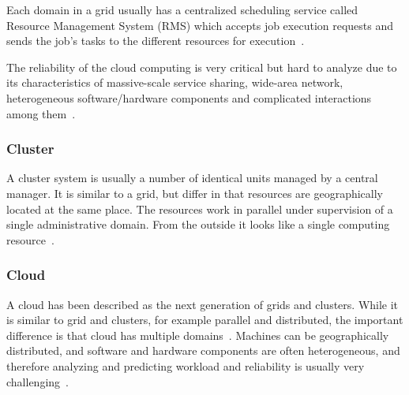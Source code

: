 \documentclass{cslthse-msc}
\begin{document}
Each domain in a grid usually has a centralized scheduling service called Resource Management System (RMS) which accepts job execution requests and sends the job's tasks to the different resources for execution~\cite{evalOfGridRel}.

The reliability of the cloud computing is very critical but hard to analyze due to its characteristics of massive-scale service sharing, wide-area network, heterogeneous software/hardware components and complicated interactions among them~\cite{cloudServiceRel}.


\subsubsection{Cluster}
A cluster system is usually a number of identical units managed by a central manager. It is similar to a grid, but differ in that resources are geographically located at the same place. The resources work in parallel under supervision of a single administrative domain. From the outside it looks like a single computing resource~\cite{compStudyLoadAndCloud}.

\subsubsection{Cloud}
A cloud has been described as the next generation of grids and clusters. While it is similar to grid and clusters, for example parallel and distributed, the important difference is that cloud has multiple domains~\cite{compStudyLoadAndCloud}. Machines can be geographically distributed, and software and hardware components are often heterogeneous, and therefore analyzing and predicting workload and reliability is usually very challenging~\cite{surveyReliabilityDistr}. 


\end{document}
